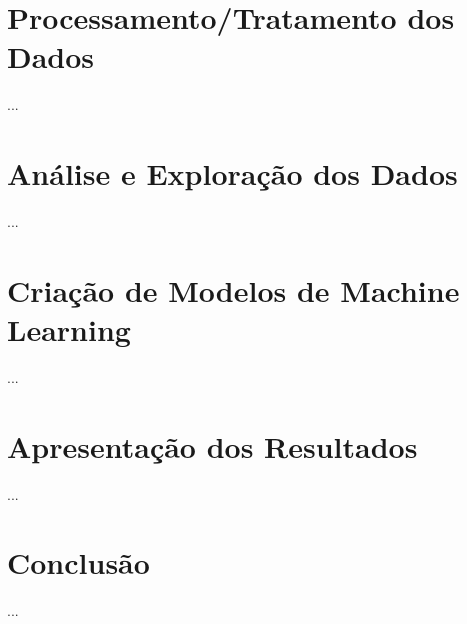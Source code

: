 \documentclass[
	12pt,				
	oneside,
	a4paper,
	english,
	brazil,
	]{abntex2}
\begin{document}

\frenchspacing 

\pretextual

\imprimircapa
\imprimirfolhaderosto*

\listoffigures*
\cleardoublepage

\listoftables*
\cleardoublepage

\tableofcontents*
\cleardoublepage

\textual

\textual




\chapter{Processamento/Tratamento dos Dados}
...

\chapter{Análise e Exploração dos Dados}
...

\chapter{Criação de Modelos de Machine Learning}
...

\chapter{Apresentação dos Resultados}
...

\chapter{Conclusão}
...

\postextual


\end{document}
